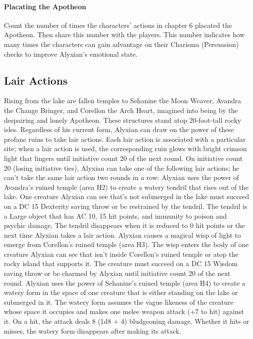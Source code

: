 \documentclass[10pt,a4,twoside,twocolumn,openany,nodeprecatedcode]{dndbook}
\begin{document}
\paragraph{Placating the Apotheon}
Count the number of times the characters' actions in chapter 6 placated the Apotheon. Then share this number with the players. This number indicates how many times the characters can gain advantage on their Charisma (Persuasion) checks to improve Alyxian's emotional state.
\subsection{Lair Actions}
Rising from the lake are fallen temples to Sehanine the Moon Weaver, Avandra the Change Bringer, and Corellon the Arch Heart, imagined into being by the despairing and lonely Apotheon. These structures stand atop 20-foot-tall rocky isles. Regardless of his current form, Alyxian can draw on the power of these profane ruins to take lair actions. Each lair action is associated with a particular site; when a lair action is used, the corresponding ruin glows with bright crimson light that lingers until initiative count 20 of the next round.
On initiative count 20 (losing initiative ties), Alyxian can take one of the following lair actions; he can't take the same lair action two rounds in a row:
{{Alyxian uses the power of Avandra's ruined temple (area H2) to create a watery tendril that rises out of the lake. One creature Alyxian can see that's not submerged in the lake must succeed on a DC 15 Dexterity saving throw or be restrained by the tendril. The tendril is a Large object that has AC 10, 15 hit points, and immunity to poison and psychic damage. The tendril disappears when it is reduced to 0 hit points or the next time Alyxian takes a lair action.}}
{{Alyxian causes a magical wisp of light to emerge from Corellon's ruined temple (area H3). The wisp enters the body of one creature Alyxian can see that isn't inside Corellon's ruined temple or atop the rocky island that supports it. The creature must succeed on a DC 15 Wisdom saving throw or be charmed by Alyxian until initiative count 20 of the next round.}}
{{Alyxian uses the power of Sehanine's ruined temple (area H4) to create a watery form in the space of one creature that is either standing on the lake or submerged in it. The watery form assumes the vague likeness of the creature whose space it occupies and makes one melee weapon attack (+7 to hit) against it. On a hit, the attack deals 8 (1d8 + 4) bludgeoning damage. Whether it hits or misses, the watery form disappears after making its attack.}}
\end{document}
